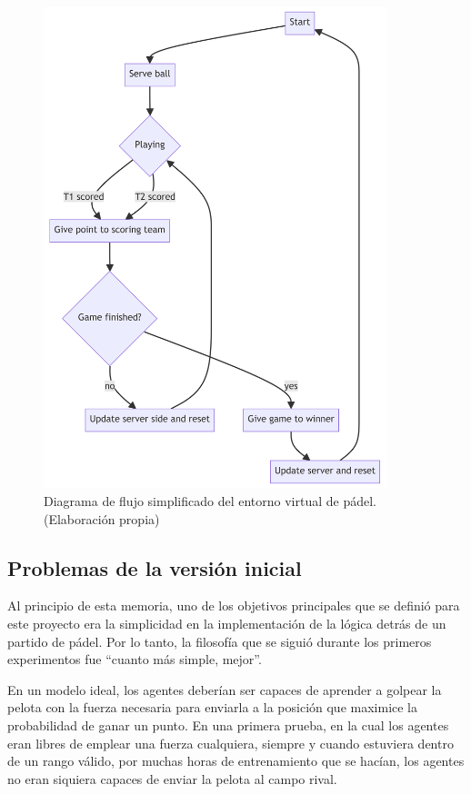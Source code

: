 \begin{figure}[H]
    \centering
    \includegraphics[width=10cm]{figures/flow-chart.png}
    \caption[Diagrama de flujo simplificado del entorno virtual de pádel]{Diagrama de flujo simplificado del entorno virtual de pádel. (Elaboración propia)}
    \label{fig:padel-flow-chart}
\end{figure}

\subsection{Problemas de la versión inicial}

Al principio de esta memoria, uno de los objetivos principales que se definió para este proyecto era la simplicidad en la implementación de la lógica detrás de un partido de pádel. Por lo tanto, la filosofía que se siguió durante los primeros experimentos fue ``cuanto más simple, mejor''.

En un modelo ideal, los agentes deberían ser capaces de aprender a golpear la pelota con la fuerza necesaria para enviarla a la posición que maximice la probabilidad de ganar un punto. En una primera prueba, en la cual los agentes eran libres de emplear una fuerza cualquiera, siempre y cuando estuviera dentro de un rango válido, por muchas horas de entrenamiento que se hacían, los agentes no eran siquiera capaces de enviar la pelota al campo rival.

